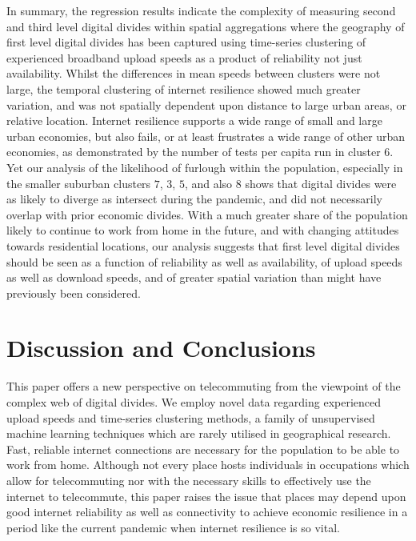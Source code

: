 \documentclass[]{interact}
\theoremstyle{plain}%
\theoremstyle{definition}
\theoremstyle{remark}
\begin{document}
In summary, the regression results indicate the complexity of measuring
second and third level digital divides within spatial aggregations where
the geography of first level digital divides has been captured using
time-series clustering of experienced broadband upload speeds as a
product of reliability not just availability. Whilst the differences in
mean speeds between clusters were not large, the temporal clustering of
internet resilience showed much greater variation, and was not spatially
dependent upon distance to large urban areas, or relative location.
Internet resilience supports a wide range of small and large urban
economies, but also fails, or at least frustrates a wide range of other
urban economies, as demonstrated by the number of tests per capita run
in cluster \(6\). Yet our analysis of the likelihood of furlough within
the population, especially in the smaller suburban clusters \(7\),
\(3\), \(5\), and also \(8\) shows that digital divides were as likely
to diverge as intersect during the pandemic, and did not necessarily
overlap with prior economic divides. With a much greater share of the
population likely to continue to work from home in the future, and with
changing attitudes towards residential locations, our analysis suggests
that first level digital divides should be seen as a function of
reliability as well as availability, of upload speeds as well as
download speeds, and of greater spatial variation than might have
previously been considered.

\hypertarget{sec:5}{%
\section{Discussion and Conclusions}\label{sec:5}}

This paper offers a new perspective on telecommuting from the viewpoint
of the complex web of digital divides. We employ novel data regarding
experienced upload speeds and time-series clustering methods, a family
of unsupervised machine learning techniques which are rarely utilised in
geographical research. Fast, reliable internet connections are necessary
for the population to be able to work from home. Although not every
place hosts individuals in occupations which allow for telecommuting nor
with the necessary skills to effectively use the internet to
telecommute, this paper raises the issue that places may depend upon
good internet reliability as well as connectivity to achieve economic
resilience in a period like the current pandemic when internet
resilience is so vital.
\end{document}
